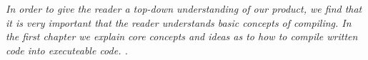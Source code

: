 \textit{In order to give the reader a top-down understanding of our product, we find that it is very important that the reader understands basic concepts of compiling. In the first chapter we explain core concepts and ideas as to how to compile written code into executeable code. .} \\ \\